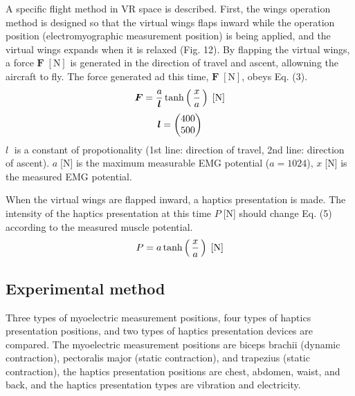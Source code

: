 \documentclass[letterpaper, 10 pt, conference]{ieeeconf}  %
\begin{document}
                
                A specific flight method in VR space is described.  
                First, the wings operation method is designed so that the virtual wings flaps inward while the operation position (electromyographic measurement position) is being applied, and the virtual wings expands when it is relaxed (Fig. 12).  
                By flapping the virtual wings, a force $\bm{F}\;[\mathrm{N}]$ is generated in the direction of travel and ascent, allowning the aircraft to fly.  
                The force generated ad this time, $\bm{F}\;[\mathrm{N}]$, obeys Eq. (3).  
                \begin{eqnarray}
                        \equlabel{force}
                        \bm{F}=\frac{a}{\bm{l}}  \tanh\left(\,\frac{x}{a}\,\right) \;[\mathrm{N}]
                \end{eqnarray}
                \begin{eqnarray}
                        \equlabel{force_prop}
                        \bm{l}=\begin{pmatrix}400 \\ 500 \end{pmatrix}
                \end{eqnarray}
                $l\;$ is a constant of propotionality (1st line: direction of travel, 2nd line: direction of ascent). 
                $a\;$[N] is the maximum measurable EMG potential ($a=1024$), $x\;$[N] is the measured EMG potential.  

                When the virtual wings are flapped inward, a haptics presentation is made.  
                The intensity of the haptics presentation at this time $P\;$[N] should change Eq. (5) according to the measured muscle potential.  
                \begin{eqnarray}
                        \equlabel{haptics}
                        P=a \tanh\left(\,\frac{x}{a}\,\right) \;[\mathrm{N}]
                \end{eqnarray}

        
        \subsection{Experimental method}
                Three types of myoelectric measurement positions, four types of haptics presentation positions, and two types of haptics presentation devices are compared.  
                The myoelectric measurement positions are biceps brachii (dynamic contraction), pectoralis major (static contraction), and trapezius (static contraction), the haptics presentation positions are chest, abdomen, waist, and back, and the haptics presentation types are vibration and electricity.
                
\end{document}
